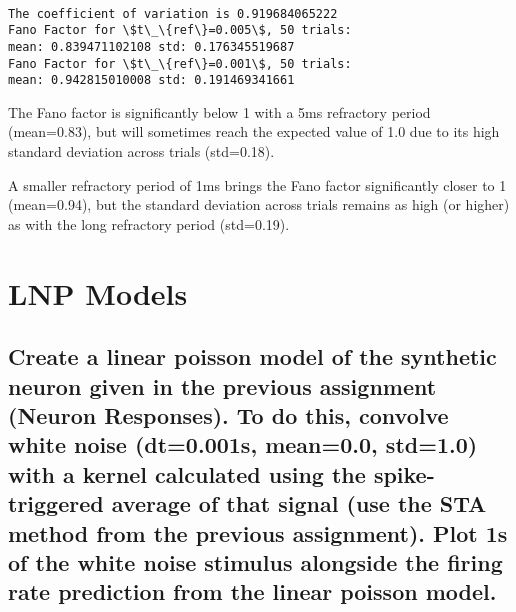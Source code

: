 \documentclass{article}
\begin{document}
    \begin{center}
    \end{center}
    { \hspace*{\fill} \\}
    
    \begin{Verbatim}[commandchars=\\\{\}]
The coefficient of variation is 0.919684065222
Fano Factor for \$t\_\{ref\}=0.005\$, 50 trials:
mean: 0.839471102108 std: 0.176345519687
Fano Factor for \$t\_\{ref\}=0.001\$, 50 trials:
mean: 0.942815010008 std: 0.191469341661
    \end{Verbatim}

The Fano factor is significantly below 1 with a 5ms refractory period (mean=0.83), but will sometimes reach the expected value of 1.0 due to its high standard deviation across trials (std=0.18).

A smaller refractory period of 1ms brings the Fano factor significantly closer to 1 (mean=0.94), but the standard deviation across trials remains as high (or higher) as with the long refractory period (std=0.19).

\section{LNP Models}

\subsection{Create a linear poisson model of the synthetic neuron given in the previous assignment (Neuron Responses). To do this, convolve white noise (dt=0.001s, mean=0.0, std=1.0) with a kernel calculated using the spike-triggered average of that signal (use the STA method from the previous assignment). Plot 1s of the white noise stimulus alongside the firing rate prediction from the linear poisson model.}
\end{document}
